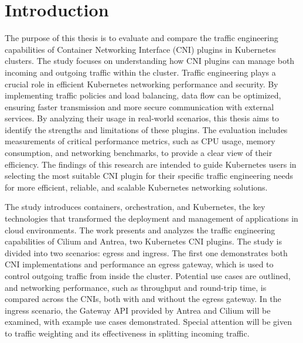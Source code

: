 \chapter{Introduction}
\label{cha:introduction}



The purpose of this thesis is to evaluate and compare the traffic engineering capabilities of Container Networking Interface (CNI) plugins in Kubernetes clusters. The study focuses on understanding how CNI plugins can manage both incoming and outgoing traffic within the cluster. Traffic engineering plays a crucial role in efficient Kubernetes networking performance and security. By implementing traffic policies and load balancing, data flow can be optimized, ensuring faster transmission and more secure communication with external services. By analyzing their usage in real-world scenarios, this thesis aims to identify the strengths and limitations of these plugins. The evaluation includes measurements of critical performance metrics, such as CPU usage, memory consumption, and networking benchmarks, to provide a clear view of their efficiency. The findings of this research are intended to guide Kubernetes users in selecting the most suitable CNI plugin for their specific traffic engineering needs for more efficient, reliable, and scalable Kubernetes networking solutions.


The study introduces containers, orchestration, and Kubernetes, the key technologies that transformed the deployment and management of applications in cloud environments. The work presents and analyzes the traffic engineering capabilities of Cilium and Antrea, two Kubernetes CNI plugins. The study is divided into two scenarios: egress and ingress. The first one demonstrates both CNI implementations and performance an egress gateway, which is used to control outgoing traffic from inside the cluster. Potential use cases are outlined, and networking performance, such as throughput and round-trip time, is compared across the CNIs, both with and without the egress gateway. In the ingress scenario, the Gateway API provided by Antrea and Cilium will be examined, with example use cases demonstrated. Special attention will be given to traffic weighting and its effectiveness in splitting incoming traffic.


